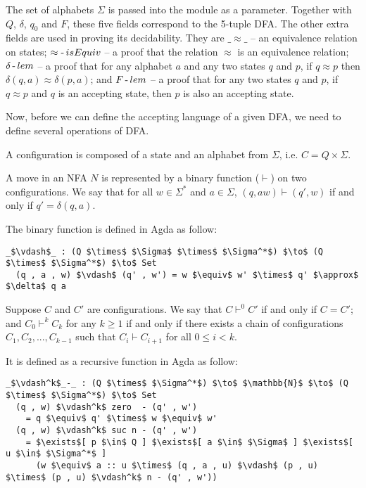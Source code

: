 \par The set of alphabets \(\Sigma\) is passed into the module as a
parameter. Together with \(Q\), \(\delta\),
\(q_0\) and \(F\), these five fields correspond to the 5-tuple
DFA. The other extra fields are used in proving its decidability. They
are \(\_\approx\_\) -- an equivalence relation on states;
\(\approx\operatorname{-} isEquiv\) -- a proof that the relation \(\approx\) is
an equivalence relation; \(\delta\operatorname{-} lem\) -- a proof that for any
alphabet \(a\) and any two states \(q\) and \(p\), if \(q \approx p\)
then \(\delta (q,a) \approx \delta (p,a)\); and \(F\operatorname{-} lem\) -- a
proof that for any two states \(q\) and \(p\), if \(q \approx p\) and
\(q\) is an accepting state, then \(p\) is also an accepting state. 

\par Now, before we can define the accepting language of a given
DFA, we need to define several operations of DFA. 

\begin{defn}
\noindent A configuration is composed of a state and an alphabet from
\(\Sigma\), i.e. \(C = Q \times \Sigma\). 
\end{defn}

\begin{defn}
\noindent A move in an NFA \(N\) is
represented by a binary function (\(\vdash\)) on two configurations. We say
that for all \(w \in \Sigma^*\) and \(a \in \Sigma\), \((q, aw)
\vdash (q' , w)\) if and only if \(q' = \delta (q , a)\). 
\end{defn}

\par The binary function is defined in Agda as follow: 
\begin{lstlisting}[mathescape=true,xleftmargin=.3\textwidth]
  _$\vdash$_ : (Q $\times$ $\Sigma$ $\times$ $\Sigma^*$) $\to$ (Q $\times$ $\Sigma^*$) $\to$ Set
  (q , a , w) $\vdash$ (q' , w') = w $\equiv$ w' $\times$ q' $\approx$ $\delta$ q a
\end{lstlisting}

\begin{defn}
\noindent Suppose \(C\) and \(C'\) are configurations. We say that \(C \vdash^0 C'\) if and only
if \(C = C'\); and \(C_0 \vdash^k C_k\) for any \(k \geq 1\) if and only if there exists a chain of
configurations \(C_1, C_2, ..., C_{k-1}\) such that \(C_i \vdash C_{i+1}\) for all \(0 \leq i < k\). 
\end{defn}

\par It is defined as a recursive function in Agda as follow: 
\begin{lstlisting}[mathescape=true,xleftmargin=.3\textwidth]
  _$\vdash^k$_-_ : (Q $\times$ $\Sigma^*$) $\to$ $\mathbb{N}$ $\to$ (Q $\times$ $\Sigma^*$) $\to$ Set
  (q , w) $\vdash^k$ zero  - (q' , w')
    = q $\equiv$ q' $\times$ w $\equiv$ w'
  (q , w) $\vdash^k$ suc n - (q' , w') 
    = $\exists$[ p $\in$ Q ] $\exists$[ a $\in$ $\Sigma$ ] $\exists$[ u $\in$ $\Sigma^*$ ]
      (w $\equiv$ a :: u $\times$ (q , a , u) $\vdash$ (p , u) $\times$ (p , u) $\vdash^k$ n - (q' , w'))
\end{lstlisting}

